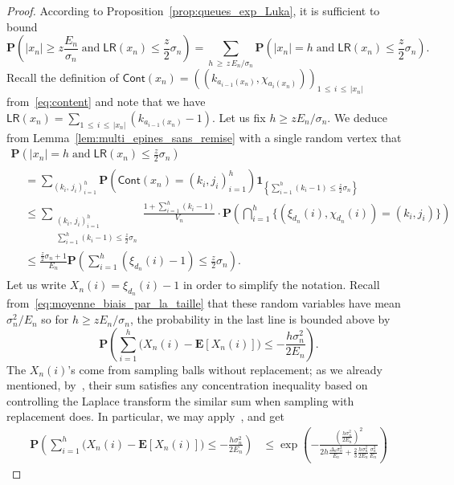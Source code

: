\documentclass[10pt]{amsart}
\theoremstyle{definition}\newtheorem{defi}[theo]{Definition}\newtheorem{rema}[theo]{Remark}\newtheorem{exam}[theo]{Example}\newtheorem{exem}[theo]{Example}\newtheorem{nota}[theo]{Notation}
\newcommand{\ensembles}[1]{\mathbf{#1}}
\renewcommand{\P}{\ensembles{P}}
\newcommand{\E}{\ensembles{E}}
\renewcommand{\Pr}[1]{\P\left(#1\right)}
\newcommand{\1}{\ensembles{1}}
\renewcommand{\le}{\leqslant}
\renewcommand{\ge}{\geqslant}
\newcommand{\LR}{\mathsf{LR}}
\newcommand{\Cont}{\mathsf{Cont}}
\newcommand{\edges}{E}
\newcommand{\vertices}{V}
\providecommand{\?}{}
\begin{document}
\begin{proof}
According to Proposition~\ref{prop:queues_exp_Luka}, it is sufficient to bound
\[
\Pr{|x_n| \ge z \frac{\edges_n}{\sigma_n}\;\text{and} \;\LR\left(x_n\right) \le \frac{z}{2} \sigma_n} = \sum_{h\, \ge\,z\,\edges_n / \sigma_n} \Pr{|x_n| = h\; \text{and}\; \LR(x_n) \le \frac{z}{2} \sigma_n}.
\]
Recall the definition of $\Cont(x_n) = ((k_{a_{i-1}(x_n)}, \chi_{a_i(x_n)}))_{1\,\le\,i\,\le\,|x_n|}$ from~\eqref{eq:content} and note that we have $\LR(x_n) = \sum_{1\,\le\,i\,\le\,|x_n|} (k_{a_{i-1}(x_n)} - 1)$. Let us fix $h \ge z \edges_n / \sigma_n$. We deduce from Lemma~\ref{lem:multi_epines_sans_remise} with a single random vertex that
\begin{multline*}
\Pr{|x_n| = h\;\text{and}\; \LR(x_n) \le \frac{z}{2} \sigma_n}
\\
\begin{aligned}
&= \sum_{\left(k_i,\,j_i\right)_{i=1}^h} \Pr{\Cont\left(x_n\right) = \left(k_i, j_i\right)_{i=1}^h} \1_{\left\{\sum\limits_{i=1}^h \left(k_i - 1\right) \le \frac{z}{2} \sigma_n\right\}}
\\
&\le \sum_{\substack{\left(k_i,\,j_i\right)_{i=1}^h \\ \sum\limits_{i=1}^h \left(k_i - 1\right) \le \frac{z}{2} \sigma_n}}
\frac{1 + \sum\limits_{i=1}^h \left(k_i - 1\right)}{\vertices_n} \cdot
\Pr{\bigcap_{i=1}^h \big\{\left(\xi_{d_n}(i), \chi_{d_n}(i)\right) = \left(k_i, j_i\right)\big\}}
\\
&\le \frac{\frac{z}{2} \sigma_n + 1}{\edges_n} \Pr{\sum_{i=1}^h \left(\xi_{d_n}(i) - 1\right) \le \frac{z}{2} \sigma_n}.
\end{aligned}
\end{multline*}
Let us write $X_n(i) = \xi_{d_n}(i) - 1$ in order to simplify the notation. Recall from~\eqref{eq:moyenne_biais_par_la_taille} that these random variables have mean $\sigma_n^2 / \edges_n$ so for $h \ge z \edges_n / \sigma_n$, the probability in the last line is bounded above by
\[
\Pr{\sum_{i=1}^h \big(X_n(i) - \E[X_n(i)]\big) \le - \frac{h \sigma_n^2}{2 \edges_n}}.
\]
The $X_n(i)$'s come from sampling balls without replacement; as we already mentioned, by~\cite[Proposition~20.6]{Ald85}, their sum satisfies any concentration inequality based on controlling the Laplace transform the similar sum when sampling with replacement does. In particular, we may apply~\cite[Theorem~2.7]{McD98}, and get
\begin{align*}
\Pr{\sum_{i=1}^h \big(X_n(i) - \E\left[X_n(i)\right]\big) \le - \frac{h \sigma_n^2}{2 \edges_n}} &\le \exp\left(- \frac{\left(\frac{h \sigma_n^2}{2 \edges_n}\right)^2}{2 h \frac{\Delta_n \sigma_n^2}{\edges_n} + \frac{2}{3} \frac{h \sigma_n^2}{2 \edges_n} \frac{\sigma_n^2}{\edges_n}}\right)

\end{align*}
\end{proof}
\end{document}
